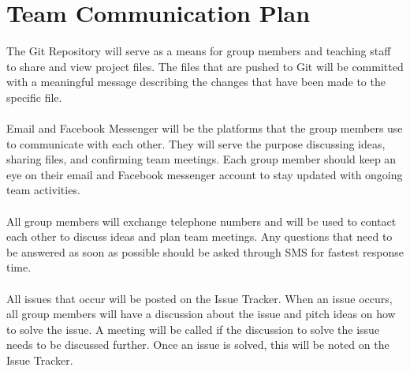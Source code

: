 \documentclass{article}
\begin{document}
\section{Team Communication Plan}
The Git Repository will serve as a means for group members and teaching staff to share and view project files. The files that are pushed to Git will be committed with a meaningful message describing the changes that have been made to the specific file. \\
\\
Email and Facebook Messenger will be the platforms that the group members use to communicate with each other. They will serve the purpose discussing ideas, sharing files, and confirming team meetings. Each group member should keep an eye on their email and Facebook messenger account to stay updated with ongoing team activities.\\
\\
All group members will exchange telephone numbers and will be used to contact each other to discuss ideas and plan team meetings. Any questions that need to be answered as soon as possible should be asked through SMS for fastest response time. \\
\\
All issues that occur will be posted on the Issue Tracker. When an issue occurs, all group members will have a discussion about the issue and pitch ideas on how to solve the issue. A meeting will be called if the discussion to solve the issue needs to be discussed further. Once an issue is solved, this will be noted on the Issue Tracker.
\end{document}

